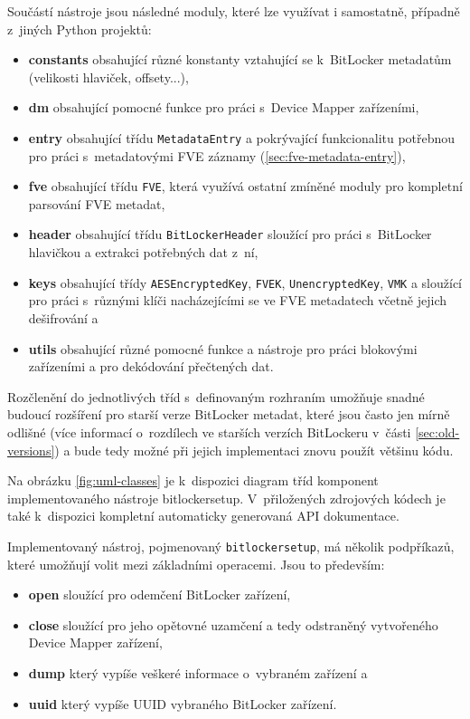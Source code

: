 Součástí nástroje jsou následné moduly, které lze využívat i samostatně, případně z~jiných Python projektů:

\begin{itemize}
	\item \textbf{constants} obsahující různé konstanty vztahující se k~BitLocker metadatům (velikosti hlaviček, offsety...),
	\item \textbf{dm} obsahující pomocné funkce pro práci s~Device Mapper zařízeními,
	\item \textbf{entry} obsahující třídu \texttt{MetadataEntry} a pokrývající funkcionalitu potřebnou pro práci s~metadatovými FVE záznamy (\ref{sec:fve-metadata-entry}),
	\item \textbf{fve} obsahující třídu \texttt{FVE}, která využívá ostatní zmíněné moduly pro kompletní parsování FVE metadat,
	\item \textbf{header} obsahující třídu \texttt{BitLockerHeader} sloužící pro práci s~BitLocker hlavičkou a extrakci potřebných dat z~ní,
	\item \textbf{keys} obsahující třídy \texttt{AESEncryptedKey}, \texttt{FVEK}, \texttt{UnencryptedKey}, \texttt{VMK} a sloužící pro práci s~různými klíči nacházejícími se ve FVE metadatech včetně jejich dešifrování a
	\item \textbf{utils} obsahující různé pomocné funkce a nástroje pro práci blokovými zařízeními a pro dekódování přečtených dat.
\end{itemize}

Rozčlenění do jednotlivých tříd s~definovaným rozhraním umožňuje snadné budoucí rozšíření pro starší verze BitLocker metadat, které jsou často jen mírně odlišné (více informací o~rozdílech ve starších verzích BitLockeru v~části \ref{sec:old-versions}) a bude tedy možné při jejich implementaci znovu použít většinu kódu.

Na obrázku \ref{fig:uml-classes} je k~dispozici diagram tříd komponent implementovaného nástroje bitlockersetup. V~přiložených zdrojových kódech je také k~dispozici kompletní automaticky generovaná API dokumentace.



Implementovaný nástroj, pojmenovaný \texttt{bitlockersetup}, má několik podpříkazů, které umožňují volit mezi základními operacemi. Jsou to především:

\begin{itemize}
	\item \textbf{open} sloužící pro odemčení BitLocker zařízení,
	\item \textbf{close} sloužící pro jeho opětovné uzamčení a tedy odstraněný vytvořeného Device Mapper zařízení,
	\item \textbf{dump} který vypíše veškeré informace o~vybraném zařízení a
	\item \textbf{uuid} který vypíše UUID vybraného BitLocker zařízení.
\end{itemize}

